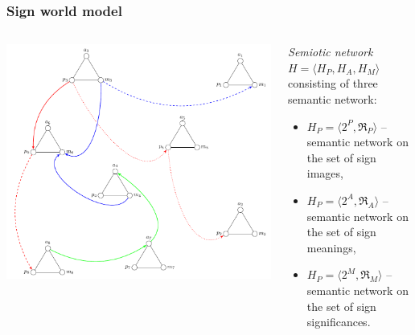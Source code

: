 \documentclass[default]{beamer}
\begin{document}
	\begin{frame}
		\frametitle{Sign world model}
		
		\begin{columns}
			\begin{column}{0.55\textwidth}
				\includegraphics[width=\textwidth]{signs/signs_net}
			\end{column}
			\begin{column}{0.45\textwidth}
				\textit{Semiotic network} $H=\langle H_P, H_A, H_M\rangle$ consisting of three semantic network: 
				\begin{itemize}
					\item $H_P=\langle2^P,\mathfrak R_P\rangle$ -- semantic network on the set of sign images,
					\item $H_P=\langle2^A,\mathfrak R_A\rangle$ -- semantic network on the set of sign meanings,
					\item $H_P=\langle2^M,\mathfrak R_M\rangle$ -- semantic network on the set of sign significances.
				\end{itemize}
			\end{column}
		\end{columns}
	\end{frame}				
\end{document}

